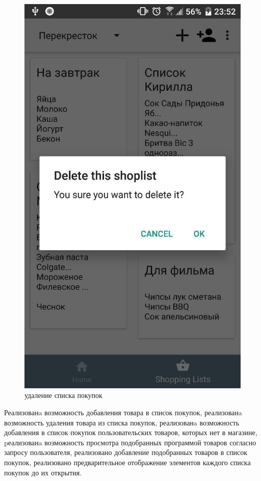 \begin{figure}[h!]
    \includegraphics[height=0.38\textheight]{./screenshots/3/delete_shoplist.jpg}
    \caption{\small{удаление списка покупок}}
    \endminipage{}
\end{figure}

Реализованa возможность добавления товара в список покупок, реализованa возможность удаления товара из
списка покупок, реализованa возможность добавления в список покупок
пользовательских товаров, которых нет в магазине, pеализованa возможность
просмотра подобранных программой товаров согласно запросу пользователя,
реализовано добавление подобранных товаров в список покупок, реализовано
предварительное отображение элементов каждого списка покупок до их открытия.

